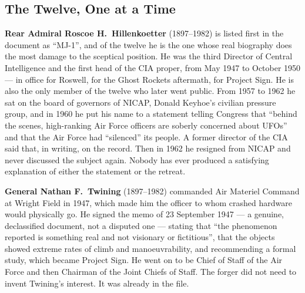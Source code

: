 \Needspace*{0.40\textheight}
\subsection{The Twelve, One at a Time}\label{sec:mj12twelve}

\textbf{Rear Admiral Roscoe H.~Hillenkoetter} (1897--1982) is listed first in the document as
``MJ-1'', and of the twelve he is the one whose real biography does the most damage to the sceptical
position. He was the third Director of Central Intelligence and the first head of the CIA proper,
from May 1947 to October 1950 --- in office for Roswell, for the Ghost Rockets aftermath, for
Project Sign. He is also the only member of the twelve who later went public. From 1957 to 1962 he
sat on the board of governors of NICAP, Donald Keyhoe's civilian pressure group, and in 1960 he put
his name to a statement telling Congress that ``behind the scenes, high-ranking Air Force officers
are soberly concerned about UFOs'' and that the Air Force had ``silenced'' its people. A former
director of the CIA said that, in writing, on the record. Then in 1962 he resigned from NICAP and
never discussed the subject again. Nobody has ever produced a satisfying explanation of either the
statement or the retreat.

\textbf{General Nathan F.~Twining} (1897--1982) commanded Air Materiel Command at Wright Field in
1947, which made him the officer to whom crashed hardware would physically go. He signed the memo
of 23 September 1947 --- a genuine, declassified document, not a disputed one --- stating that
``the phenomenon reported is something real and not visionary or fictitious'', that the objects
showed extreme rates of climb and manoeuvrability, and recommending a formal study, which became
Project Sign. He went on to be Chief of Staff of the Air Force and then Chairman of the Joint
Chiefs of Staff. The forger did not need to invent Twining's interest. It was already in the file.

